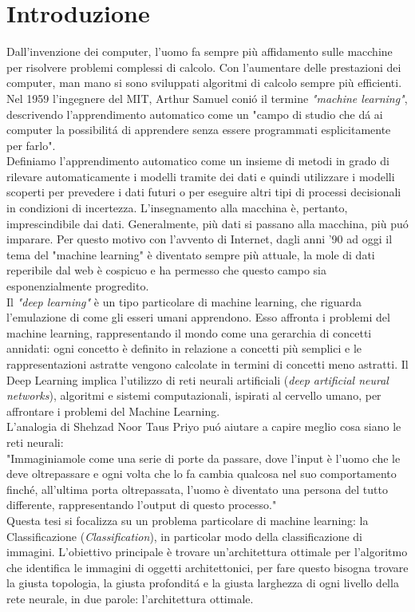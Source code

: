 \documentclass[a4paper,12pt,oneside]{book}
\begin{document}
\section*{Introduzione}
Dall'invenzione dei computer, l'uomo fa sempre pi\`{u} affidamento sulle macchine per risolvere problemi complessi di calcolo. Con l'aumentare delle prestazioni dei computer, man mano si sono sviluppati algoritmi di calcolo sempre pi\`{u} efficienti.
Nel 1959 l'ingegnere del MIT, Arthur Samuel coni\'{o} il termine \textit{"machine learning"}, descrivendo l'apprendimento automatico come un "campo di studio che d\'{a} ai computer la possibilit\'{a} di apprendere senza essere programmati esplicitamente per farlo".\cite{Samuel} \\
Definiamo l'apprendimento automatico come un insieme di metodi in grado di rilevare automaticamente i modelli tramite dei dati e quindi utilizzare i modelli scoperti per prevedere i dati futuri o per eseguire altri tipi di processi decisionali in condizioni di incertezza. L'insegnamento alla macchina \`e, pertanto, imprescindibile dai dati. Generalmente, pi\`{u} dati si passano alla macchina, pi\`{u} pu\'{o} imparare. Per questo motivo con l'avvento di Internet, dagli anni '90 ad oggi il tema del "machine learning" \`e diventato sempre pi\`{u} attuale, la mole di dati reperibile dal web \`e cospicuo e ha permesso che questo campo sia esponenzialmente progredito.\\
Il \textit{"deep learning"} \`e un tipo particolare di machine learning, che riguarda l'emulazione di come gli esseri umani apprendono. Esso affronta i problemi del machine learning, rappresentando il mondo come una gerarchia di concetti annidati: ogni concetto \`e definito in relazione a concetti pi\`{u} semplici e le rappresentazioni astratte vengono calcolate in termini di concetti meno astratti. Il Deep Learning implica l'utilizzo di reti neurali artificiali (\textit{deep artificial neural networks}), algoritmi e sistemi computazionali, ispirati al cervello umano, per affrontare i problemi del Machine Learning.\\
L'analogia di Shehzad Noor Taus Priyo pu\'{o} aiutare a capire meglio cosa siano le reti neurali:\\
"Immaginiamole come una serie di porte da passare, dove l'input \`e l'uomo che le deve oltrepassare e ogni volta che lo fa cambia qualcosa nel suo comportamento finch\'{e}, all'ultima porta oltrepassata, l'uomo \`e diventato una persona del tutto differente, rappresentando l'output di questo processo."\cite{analogia} \\
Questa tesi si focalizza su un problema particolare di machine learning: la Classificazione (\textit{Classification}), in particolar modo della classificazione di immagini. L'obiettivo principale \`e trovare un'architettura ottimale per l'algoritmo che identifica le immagini di oggetti architettonici, per fare questo bisogna trovare la giusta topologia, la giusta profondit\'{a} e la giusta larghezza di ogni livello della rete neurale, in due parole: l'architettura ottimale. %
 
\end{document}
